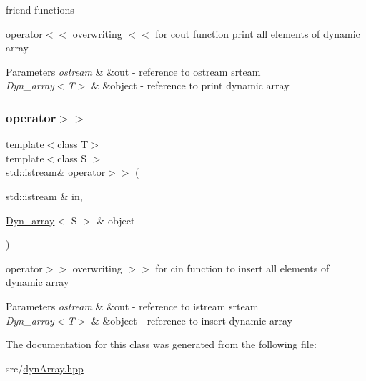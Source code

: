 friend functions 

operator$<$$<$ overwriting $<$$<$ for cout function print all elements of dynamic array 
\begin{DoxyParams}{Parameters}
{\em ostream} & \&out -\/ reference to ostream srteam \\
\hline
{\em Dyn\+\_\+array$<$\+T$>$} & \&object -\/ reference to print dynamic array \\
\hline
\end{DoxyParams}
\mbox{\label{classDyn__array_a3b9156ade0a68fef20fc21e06aed9cc0}} 
\subsubsection{\texorpdfstring{operator$>$$>$}{operator>>}}
{\footnotesize\ttfamily template$<$class T$>$ \\
template$<$class S $>$ \\
std\+::istream\& operator$>$$>$ (\begin{DoxyParamCaption}\item[{std\+::istream \&}]{in,  }\item[{\hyperlink{classDyn__array}{Dyn\+\_\+array}$<$ S $>$ \&}]{object }\end{DoxyParamCaption})\hspace{0.3cm}{\ttfamily [friend]}}



operator$>$$>$ overwriting $>$$>$ for cin function to insert all elements of dynamic array 


\begin{DoxyParams}{Parameters}
{\em ostream} & \&out -\/ reference to istream srteam \\
\hline
{\em Dyn\+\_\+array$<$\+T$>$} & \&object -\/ reference to insert dynamic array \\
\hline
\end{DoxyParams}


The documentation for this class was generated from the following file\+:\begin{DoxyCompactItemize}
\item 
src/\hyperlink{dynArray_8hpp}{dyn\+Array.\+hpp}\end{DoxyCompactItemize}
